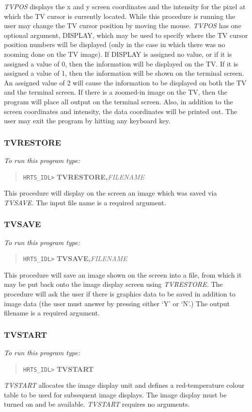 {\em TVPOS} displays the x and y screen coordinates and the intensity for the
pixel at which the TV cursor is currently located.  While this procedure is
running the user may change the TV cursor position by moving the mouse.  {\em
TVPOS} has one optional argument, DISPLAY, which may be used to specify where
the TV cursor position numbers will be displayed (only in the case in which
there was no zooming done on the TV image).  If DISPLAY is assigned no value,
or if it is assigned a value of 0, then the information will be displayed on
the TV.  If it is assigned a value of 1, then the information will be shown on
the terminal screen.  An assigned value of 2 will cause the information to be
displayed on both the TV and the terminal screen.  If there is a zoomed-in
image on the TV, then the program will place all output on the terminal screen. 
Also, in addition to the screen coordinates and intensity, the data coordinates
will be printed out. The user may exit the program by hitting any keyboard key.

\subsubsection{TVRESTORE}

{\em To run this program type:}
\begin{quote}   
     {\tt HRTS\_IDL>} {\bf TVRESTORE,}{\it FILENAME}         
\end{quote}   
This procedure will display on the  screen an image which was saved via {\em
TVSAVE.} The input file name is a required argument.

\subsubsection{TVSAVE}

{\em To run this program type:}
\begin{quote}
    {\tt HRTS\_IDL>} {\bf TVSAVE,}{\it FILENAME}          
\end{quote}      
This procedure will save an image shown on the  screen into a file, from which
it may be put back onto the image display screen using {\em TVRESTORE.}  The
procedure will ask the user if there is graphics data to be saved in addition
to image data (the user must answer by pressing either `Y' or `N'.)  The output
filename is a required argument.

\subsubsection{TVSTART}

{\em To run this program type:}
\begin{quote}   
     {\tt HRTS\_IDL>} {\bf TVSTART}         
\end{quote}   
{\em TVSTART} allocates the image display unit and defines a red-temperature 
colour table to be used for subsequent image displays. The image display must
be turned  on and be available. {\em TVSTART} requires no arguments.

\typeout{ }
\typeout{ }


